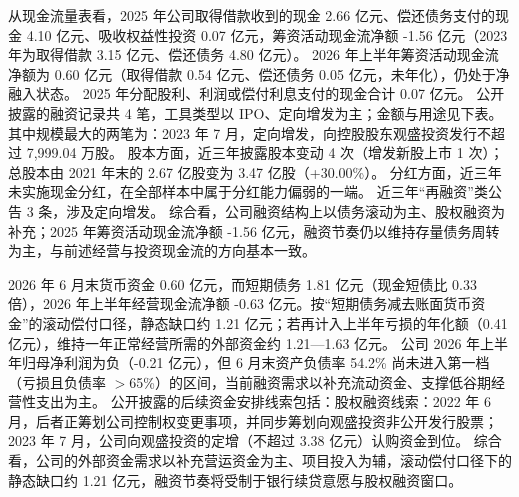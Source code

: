  从现金流量表看，2025 年公司取得借款收到的现金 2.66 亿元、偿还债务支付的现金 4.10 亿元、吸收权益性投资 0.07 亿元，筹资活动现金流净额 -1.56 亿元（2023 年为取得借款 3.15 亿元、偿还债务 4.80 亿元）。 2026 年上半年筹资活动现金流净额为 0.60 亿元（取得借款 0.54 亿元、偿还债务 0.05 亿元，未年化），仍处于净融入状态。 2025 年分配股利、利润或偿付利息支付的现金合计 0.07 亿元。 公开披露的融资记录共 4 笔，工具类型以 IPO、定向增发为主；金额与用途见下表。 其中规模最大的两笔为：2023 年 7 月，定向增发，向控股股东观盛投资发行不超过 7,999.04 万股。 股本方面，近三年披露股本变动 4 次（增发新股上市 1 次）；总股本由 2021 年末的 2.67 亿股变为 3.47 亿股（+30.00\%）。 分红方面，近三年未实施现金分红，在全部样本中属于分红能力偏弱的一端。 近三年“再融资”类公告 3 条，涉及定向增发。 综合看，公司融资结构上以债务滚动为主、股权融资为补充；2025 年筹资活动现金流净额 -1.56 亿元，融资节奏仍以维持存量债务周转为主，与前述经营与投资现金流的方向基本一致。

 2026 年 6 月末货币资金 0.60 亿元，而短期债务 1.81 亿元（现金短债比 0.33 倍），2026 年上半年经营现金流净额 -0.63 亿元。按“短期债务减去账面货币资金”的滚动偿付口径，静态缺口约 1.21 亿元；若再计入上半年亏损的年化额（0.41 亿元），维持一年正常经营所需的外部资金约 1.21---1.63 亿元。 公司 2026 年上半年归母净利润为负（-0.21 亿元），但 6 月末资产负债率 54.2\% 尚未进入第一档（亏损且负债率 $>$65\%）的区间，当前融资需求以补充流动资金、支撑低谷期经营性支出为主。 公开披露的后续资金安排线索包括：股权融资线索：2022 年 6 月，后者正筹划公司控制权变更事项，并同步筹划向观盛投资非公开发行股票；2023 年 7 月，公司向观盛投资的定增（不超过 3.38 亿元）认购资金到位。 综合看，公司的外部资金需求以补充营运资金为主、项目投入为辅，滚动偿付口径下的静态缺口约 1.21 亿元，融资节奏将受制于银行续贷意愿与股权融资窗口。




